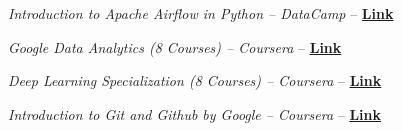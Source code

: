 \begin{inlineitems}
  \item \emph{Introduction to Apache Airflow in Python – DataCamp} – \textbf{\href{https://www.example.com/certificate}{Link}}

  \item \emph{Google Data Analytics (8 Courses) – Coursera} – \textbf{\href{https://www.example.com/certificate}{Link}}

  \item \emph{Deep Learning Specialization (8 Courses) – Coursera} – \textbf{\href{https://www.example.com/certificate}{Link}} 

  \item \emph{Introduction to Git and Github by Google – Coursera} – \textbf{\href{https://www.example.com/certificate}{Link}} 
  
\end{inlineitems}
